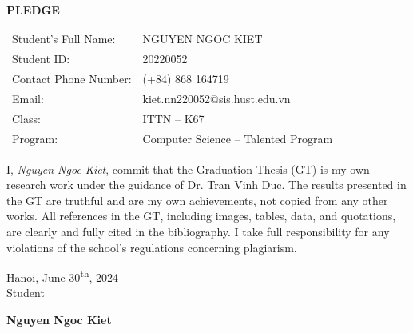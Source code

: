 \documentclass[../main.tex]{subfiles}
\begin{document}
\thispagestyle{empty}

\begin{center}
    {\Large \textbf{PLEDGE}}
\end{center}

\vspace{1.2cm}

\noindent
\begin{tabular}{@{}p{5cm}p{9cm}@{}}
Student's Full Name: & NGUYEN NGOC KIET \\
Student ID: & 20220052 \\
Contact Phone Number: & (+84) 868 164719 \\
Email: & kiet.nn220052@sis.hust.edu.vn \\
Class: & ITTN -- K67 \\
Program: & Computer Science -- Talented Program \\
\end{tabular}

\vspace{1.3cm}

\noindent
I, \textit{Nguyen Ngoc Kiet}, commit that the Graduation Thesis (GT) is my own research
work under the guidance of Dr. Tran Vinh Duc. The results presented in the GT are
truthful and are my own achievements, not copied from any other works. All references in
the GT, including images, tables, data, and quotations, are clearly and fully cited in the
bibliography. I take full responsibility for any violations of the school's regulations concerning
plagiarism.

\vspace{1cm}

\begin{flushright}
Hanoi, June 30\textsuperscript{th}, 2024 \\[0.2cm]
Student
\end{flushright}

\vspace{2.6cm}

\begin{flushright}
\textbf{Nguyen Ngoc Kiet}
\end{flushright}
\end{document}
